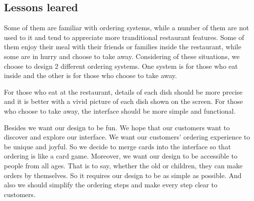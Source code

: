 \documentclass[a4paper,12pt]{article}
\begin{document}
\subsection{Lessons leared}

Some of them are familiar with ordering systems, while a number of them are not used to it and tend to appreciate
more tranditional restaurant features. Some of them enjoy their meal with their friends or families inside the
restaurant, while some are in hurry and choose to take away. Considering of these situations, we choose to design
2 different ordering systems. One system is for those who eat inside and the other is for those who choose to take
away.

For those who eat at the restaurant, details of each dish should be more precise and it is better with a vivid
picture of each dish shown on the screen. For those who choose to take away, the interface should be more simple
and functional.

Besides we want our design to be fun. We hope that our customers want to discover and explore our
interface. We want our customers’ ordering experience to be unique and joyful. So we decide to merge cards into the
interface so that ordering is like a card game. Moreover, we want our design to be accessible to people from all
ages. That is to say, whether the old or children, they can make orders by themselves. So it requires our design
to be as simple as possible. And also we should simplify the ordering steps and make every step clear to customers.
\end{document}
